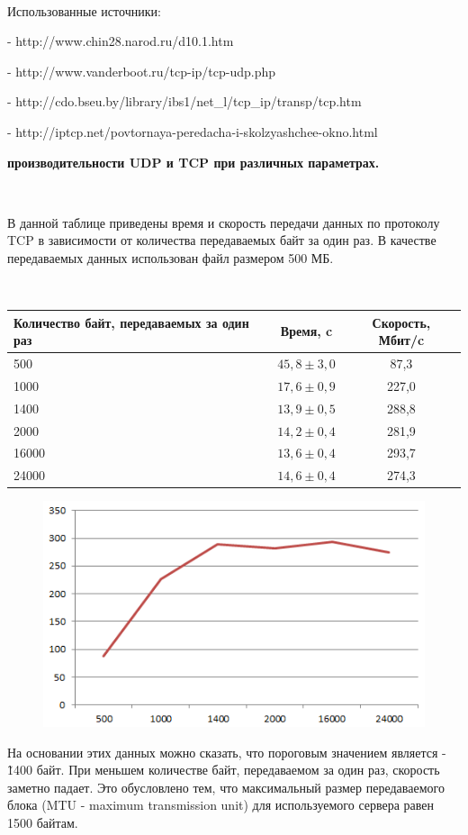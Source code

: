 \documentclass{article}
\begin{document}
~\

Использованные источники:

- http://www.chin28.narod.ru/d10.1.htm 

- http://www.vanderboot.ru/tcp-ip/tcp-udp.php

- http://cdo.bseu.by/library/ibs1/net\_l/tcp\_ip/transp/tcp.htm

- http://iptcp.net/povtornaya-peredacha-i-skolzyashchee-okno.html

\newpage

\textbf{ производительности UDP и TCP при различных параметрах.}

~\

В данной таблице приведены время и скорость передачи данных по протоколу TCP в зависимости от количества передаваемых байт за один раз. В качестве передаваемых данных использован файл размером 500 МБ.

~\

\begin{table}[h]
\begin{tabular}{|p{130pt}|c|c|}
\hline
Количество байт, передаваемых за один раз & Время, c & Скорость, Мбит/c \\
\hline
500 & $45,8 \pm 3,0$ & 87,3 \\
1000 & $17,6 \pm 0,9$ & 227,0 \\
1400 & $13,9 \pm 0,5$ & 288,8 \\
2000 & $14,2 \pm 0,4$ & 281,9 \\
16000 & $13,6 \pm 0,4$ & 293,7 \\
24000 & $14,6 \pm 0,4$ & 274,3 \\
\hline
\end{tabular}
\end{table}

\begin{figure}[h]
\includegraphics[scale=0.7]{6}
\end{figure}

На основании этих данных можно сказать, что пороговым значением является - \~ 1400 байт. При меньшем количестве байт, передаваемом за один раз, скорость заметно падает. Это обусловлено тем, что максимальный размер передаваемого блока (MTU - maximum transmission unit) для используемого сервера равен 1500 байтам.
\end{document}
